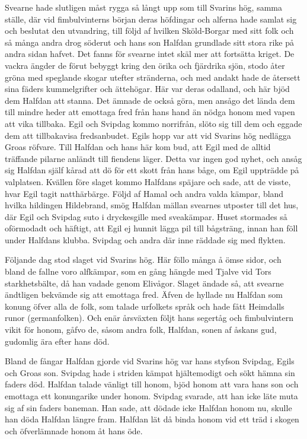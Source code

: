 Svearne hade slutligen måst rygga så långt upp som till Svarins hög,
samma ställe, där vid fimbulvinterns början deras höfdingar och alferna
hade samlat sig och beslutat den utvandring, till följd af hvilken
Sköld-Borgar med sitt folk och så många andra drog söderut och hans son
Halfdan grundlade sitt stora rike på andra sidan hafvet. Det fanns för
svearne intet skäl mer att fortsätta kriget. De vackra ängder de förut
bebyggt kring den örika och fjärdrika sjön, stodo åter gröna med
speglande skogar utefter stränderna, och med andakt hade de återsett
sina fäders kummelgrifter och ättehögar. Här var deras odalland, och här
bjöd dem Halfdan att stanna. Det ämnade de också göra, men ansågo det
lända dem till mindre heder att emottaga fred från hans hand än nödga
honom med vapen att vika tillbaka. Egil och Svipdag kommo norrifrån,
slöto sig till dem och eggade dem att tillbakavisa fredsanbudet. Egils
hopp var att vid Svarins hög nedlägga Groas röfvare. Till Halfdan och
hans här kom bud, att Egil med de alltid träffande pilarne anländt till
fiendens läger. Detta var ingen god nyhet, och ansåg sig Halfdan själf
kårad att dö för ett skott från hans båge, om Egil uppträdde på
valplatsen. Kvällen före slaget kommo Halfdans späjare och sade, att de
visste, hvar Egil tagit natthärbärge. Följd af Hamal och andra valda
kämpar, bland hvilka hildingen Hildebrand, smög Halfdan mällan svearnes
utposter till det hus, där Egil och Svipdag suto i dryckesgille med
sveakämpar. Huset stormades så oförmodadt och häftigt, att Egil ej
hunnit lägga pil till bågsträng, innan han föll under Halfdans klubba.
Svipdag och andra där inne räddade sig med flykten.

Följande dag stod slaget vid Svarins hög. Här föllo
många å ömse sidor, och bland de fallne voro alfkämpar, som en gång
hängde med Tjalve vid Tors starkhetsbälte, då han vadade genom Elivågor.
Slaget ändade så, att svearne ändtligen bekvämde sig att emottaga fred.
Äfven de hyllade nu Halfdan som konung öfver alla de folk, som talade
urfolkets språk och hade fått Heimdalls runor (germanfolken). Och enär
årsväxten följt hans segertåg och fimbulvintern vikit för honom, gåfvo
de, såsom andra folk, Halfdan, sonen af åskans gud, gudomlig ära efter
hans död.

Bland de fångar Halfdan gjorde vid Svarins hög var hans styfson Svipdag,
Egils och Groas son. Svipdag hade i striden kämpat hjältemodigt och sökt
hämna sin faders död. Halfdan talade vänligt till honom, bjöd honom att
vara hans son och emottaga ett konungarike under honom. Svipdag svarade,
att han icke läte muta sig af sin faders baneman. Han sade, att dödade
icke Halfdan honom nu, skulle han döda Halfdan längre fram. Halfdan lät
då binda honom vid ett träd i skogen och öfverlämnade honom åt hans öde.

